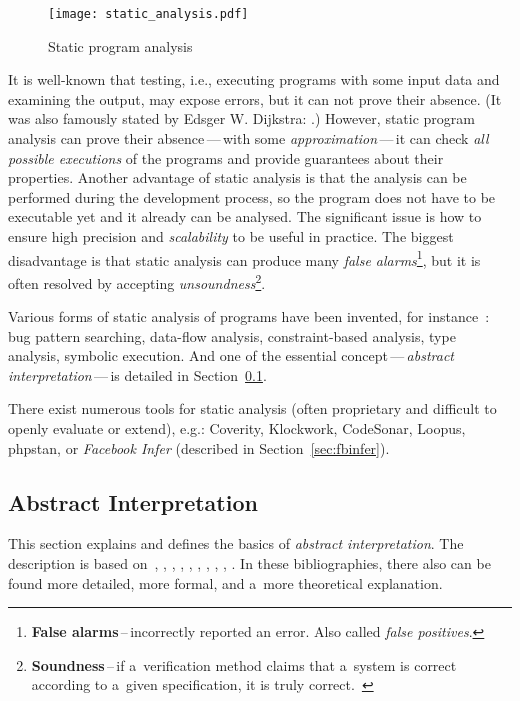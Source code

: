 \begin{figure}[hbt]
    \centering
    \texttt{[image: static\_analysis.pdf]}
    \caption{%
        Static program analysis~\cite{AIBasedFormalMethodsCousot}
    }
    \label{fig:statAnalysis}
\end{figure}

It is well-known that testing, i.e., executing programs
with some input data and examining the output, may expose errors, but it
can not prove their absence. (It was also famously stated by Edsger W.
Dijkstra: .) However, static program analysis
can prove their absence\,---\,with some \emph{approximation}\,---\,it can
check \emph{all possible executions} of the programs and provide guarantees
about their properties. Another advantage of static analysis is that the
analysis can be performed during the development process, so the program
does not have to be executable yet and it already can be analysed.
The significant issue is how to ensure high precision and
\emph{scalability} to be useful in practice. The biggest disadvantage is
that static analysis can produce many \emph{false alarms}\footnote{%
\textbf{False alarms}\,--\,incorrectly reported an error. Also called
\emph{false positives}.}, but it is often
resolved by accepting \emph{unsoundness}\footnote{\textbf{Soundness}\,--\,if
a~verification method claims that a~system is correct according to a~given
specification, it is truly correct.~\cite{favStaticAnalysis}}.

Various forms of static analysis of programs have been invented, for
instance~\cite{favStaticAnalysis}: bug pattern searching, data-flow
analysis, constraint-based analysis, type analysis, symbolic execution. And
one of the essential concept\,---\,\emph{abstract interpretation}\,---\,is
detailed in Section~\ref{sec:AI}.

There exist numerous tools for static analysis (often proprietary and
difficult to openly evaluate or extend), e.g.: Coverity, Klockwork, CodeSonar,
Loopus, phpstan, or \emph{Facebook Infer} (described in
Section~\ref{sec:fbinfer}).


\subsection{Abstract Interpretation}
\label{sec:AI}

This section explains and defines the basics of \emph{abstract interpretation}.
The description is based on~\cite{AIBasedFormalMethodsCousot},
\cite{AILatticeModelCousot}, \cite{AIInNutshellCousot}, \cite{AICousotWeb},
\cite{favAI}, \cite{projectPracticeMarcin2018}, \cite{wideningNarrowingCousot},
\cite{programAnalysisNielson}, \cite{staticAnalysisMoller},
\cite{favLatticesAndFixpoints}. In these bibliographies, there also can be
found more detailed, more formal, and a~more theoretical explanation.

